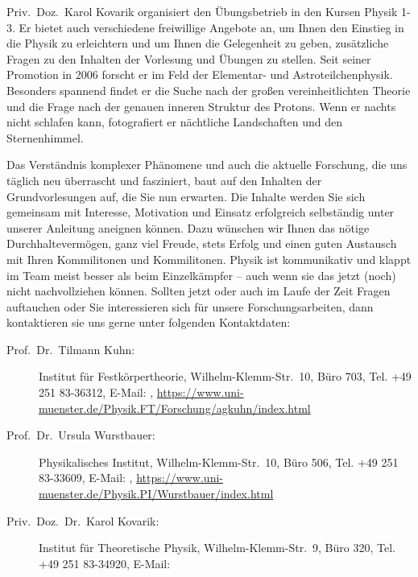 \begin{multicols}{2}
Priv.\ Doz.\ Karol Kovarik organisiert den Übungsbetrieb in den Kursen Physik 1-3. Er bietet auch 
verschiedene freiwillige Angebote an, um Ihnen den Einstieg in die Physik zu erleichtern und um Ihnen 
die Gelegenheit zu geben, zusätzliche Fragen zu den Inhalten der Vorlesung und Übungen zu stellen. 
Seit seiner Promotion in 2006 forscht er im Feld der Elementar- und Astroteilchenphysik. Besonders 
spannend findet er die Suche nach der großen vereinheitlichten Theorie und die Frage nach der 
genauen inneren Struktur des Protons. Wenn er nachts nicht schlafen kann, fotografiert er nächtliche 
Landschaften und den Sternenhimmel. 

Das Verständnis komplexer Phänomene und auch die aktuelle Forschung, die uns täglich neu 
überrascht und fasziniert, baut auf den Inhalten der Grundvorlesungen auf, die Sie nun erwarten. Die 
Inhalte werden Sie sich gemeinsam mit Interesse, Motivation und Einsatz erfolgreich selbständig unter 
unserer Anleitung aneignen können. Dazu wünschen wir Ihnen das nötige Durchhaltevermögen, ganz 
viel Freude, stets Erfolg und einen guten Austausch mit Ihren Kommilitonen und Kommilitonen. Physik 
ist kommunikativ und klappt im Team meist besser als beim Einzelkämpfer – auch wenn sie das jetzt (noch) 
nicht nachvollziehen können. Sollten jetzt oder auch im Laufe der Zeit Fragen auftauchen oder Sie 
interessieren sich für unsere Forschungsarbeiten, dann kontaktieren sie uns gerne unter folgenden 
Kontaktdaten: 

\begin{description}
	\item[Prof.\ Dr.\ Tilmann Kuhn:] Institut für Festkörpertheorie, Wilhelm-Klemm-Str.\ 10, Büro 703, Tel. +49 
		251 83-36312, E-Mail: , \url{https://www.uni-muenster.de/Physik.FT/Forschung/agkuhn/index.html}

	\item[Prof.\ Dr.\ Ursula Wurstbauer:] Physikalisches Institut, Wilhelm-Klemm-Str.\ 10, Büro 506, Tel. +49 251 
		83-33609, E-Mail: , \url{https://www.uni-muenster.de/Physik.PI/Wurstbauer/index.html}

	\item[Priv.\ Doz.\ Dr.\ Karol Kovarik:] Institut für Theoretische Physik, Wilhelm-Klemm-Str.\ 9, Büro 320, Tel. 
		+49 251 83-34920, E-Mail: 
\end{description}


\end{multicols}

